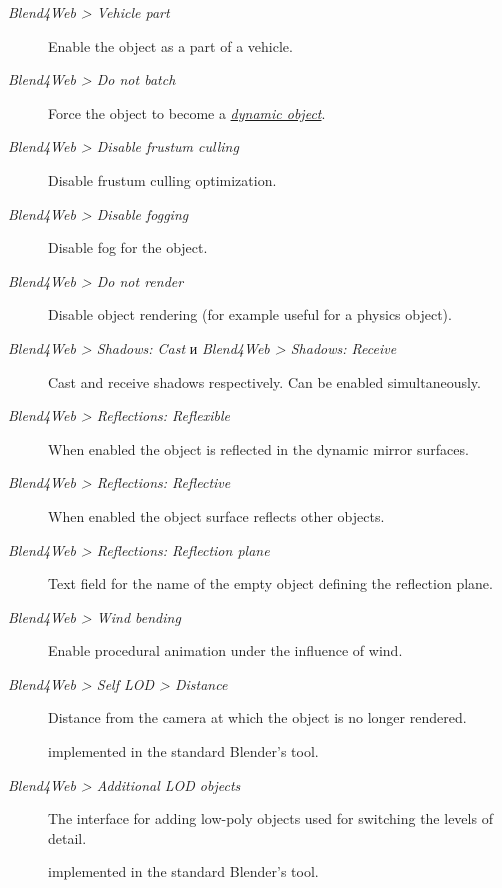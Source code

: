 \documentclass[a4paper,12pt,oneside]{sphinxmanual}
\begin{document}
\begin{description}
\item[{\emph{Blend4Web \textgreater{} Vehicle part}}] \leavevmode
Enable the object as a part of a vehicle.

\item[{\emph{Blend4Web \textgreater{} Do not batch}}] \leavevmode
Force the object to become a {\hyperref[objects:static-dynamic-objects]{\emph{dynamic object}}}.

\item[{\emph{Blend4Web \textgreater{} Disable frustum culling}}] \leavevmode
Disable frustum culling optimization.

\item[{\emph{Blend4Web \textgreater{} Disable fogging}}] \leavevmode
Disable fog for the object.

\item[{\emph{Blend4Web \textgreater{} Do not render}}] \leavevmode
Disable object rendering (for example useful for a physics object).

\item[{\emph{Blend4Web \textgreater{} Shadows: Cast} и \emph{Blend4Web \textgreater{} Shadows: Receive}}] \leavevmode
Cast and receive shadows respectively. Can be enabled simultaneously.

\item[{\emph{Blend4Web \textgreater{} Reflections: Reflexible}}] \leavevmode
When enabled the object is reflected in the dynamic mirror surfaces.

\item[{\emph{Blend4Web \textgreater{} Reflections: Reflective}}] \leavevmode
When enabled the object surface reflects other objects.

\item[{\emph{Blend4Web \textgreater{} Reflections: Reflection plane}}] \leavevmode
Text field for the name of the empty object defining the reflection plane.

\item[{\emph{Blend4Web \textgreater{} Wind bending}}] \leavevmode
Enable procedural animation under the influence of wind.

\item[{\emph{Blend4Web \textgreater{} Self LOD \textgreater{} Distance}}] \leavevmode
Distance from the camera at which the object is no longer rendered.

implemented in the standard  Blender's tool.

\item[{\emph{Blend4Web \textgreater{} Additional LOD objects}}] \leavevmode
The interface for adding low-poly objects used for switching the levels of detail.

implemented in the standard  Blender's tool.

\end{description}
\end{document}
